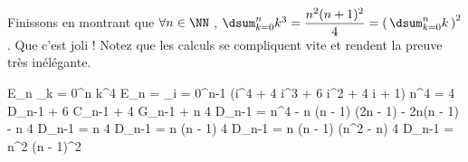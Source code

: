 \medskip


Finissons en montrant que
$\forall n \in \NN$ , $\dsum_{k = 0}^{n} k^3 = \dfrac{n^2 (n + 1)^2}{4} = \left( \, \dsum_{k = 0}^{n} k \, \right)^2$ . Que c'est joli !
Notez que les calculs se compliquent vite et rendent la preuve très inélégante.

\medskip

\begin{explain}[style = sar, ope = \iff]
	E_n \eqdef  \dsum_{k = 0}^{n} k^4
		\explnext{}
	E_n = \dsum_{i = 0}^{n-1} (i^4 + 4 i^3 + 6 i^2 + 4 i + 1)
		\explnext{}
	n^4 = 4 D_{n-1} + 6 C_{n-1} + 4 G_{n-1} + n
		\explnext{}
	4 D_{n-1} = n^4 - n (n - 1) (2n - 1) - 2n(n - 1) - n
		\explnext{}
	4 D_{n-1} = n \cdot {}
	4 D_{n-1} = n (n - 1) \cdot {}
		\explnext{}
	4 D_{n-1} = n (n - 1) (n^2 - n)
		\explnext{}
	4 D_{n-1} = n^2 (n - 1)^2
\end{explain}


